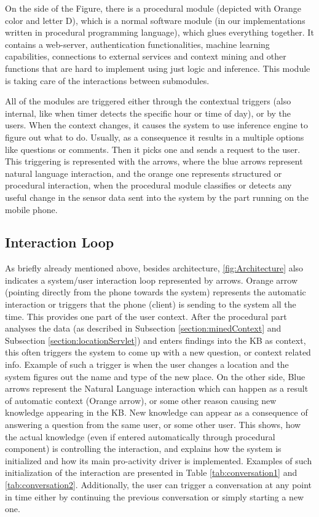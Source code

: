 On the side of the Figure, there is a procedural module (depicted with Orange
color and letter D), which is a normal software module (in our implementations
written in procedural programming language), which glues everything together.
It contains a web-server, authentication functionalities, machine
learning capabilities, connections to external services and context mining
and other functions that are hard to implement using just logic and inference.
This module is taking care of the interactions between submodules. 

All of the modules are triggered either through the contextual triggers 
(also internal, like when timer detects the specific hour or time of day), or
by the users. When the context changes, it causes the system to use inference
engine to figure out what to do. Usually, as a consequence it results in a 
multiple options like questions or comments. Then it picks one and sends a 
request to the user. This triggering is represented with the arrows, where the 
blue arrows represent natural language interaction, and the orange one
represents structured or procedural interaction, when the procedural module
classifies or detects any useful change in the sensor data sent into the system
by the part running on the mobile phone.

\subsection{Interaction Loop}
\label{section:interaction}
As briefly already mentioned above, besides architecture, 
\autoref{fig:Architecture} also indicates a system/user interaction loop 
represented by arrows. Orange arrow (pointing 
directly from the phone towards the system) represents the automatic interaction
or triggers that the phone (client) is sending to the system all the time. This
provides one part of the user context. After the procedural part analyses
the data (as described in Subsection \ref{section:minedContext} and 
Subsection \ref{section:locationServlet}) and enters findings into the KB as 
context, this often triggers the system to come up with a new question, or 
context related info. Example of such a trigger is when the user changes a location and the system figures out the name and type of the new place. On the other side, Blue arrows represent the Natural Language interaction which can happen as a result of automatic context (Orange arrow), or some other reason causing new knowledge appearing in the KB. New knowledge can appear as a consequence of answering a question from the same user, or some other user. This shows, how the
actual knowledge (even if entered automatically through procedural component) is
controlling the interaction, and explains how the system is initialized and how
its main pro-activity driver is implemented. Examples of such initialization
of the interaction are presented in Table \autoref{tab:conversation1} and
\autoref{tab:conversation2}. Additionally, the user can trigger a conversation at any point in time either by continuing the 
previous conversation or simply starting a new one. 

